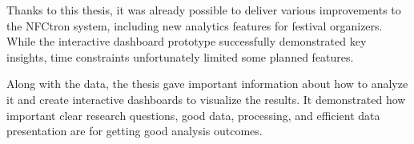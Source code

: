 Thanks to this thesis, it was already possible to deliver various improvements to the NFCtron system, including new analytics features for festival organizers.
While the interactive dashboard prototype successfully demonstrated key insights, time constraints unfortunately limited some planned features.

Along with the data, the thesis gave important information about how to analyze it and create interactive dashboards to visualize the results.
It demonstrated how important clear research questions, good data, processing, and efficient data presentation are for getting good analysis outcomes.